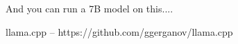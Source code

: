 \documentclass{beamer}
\begin{document}
\begin{frame}[plain]
\end{frame}

\begin{frame}
	And you can run a 7B model on this....
\end{frame}

\begin{frame}[plain]
\end{frame}


\begin{frame}
	llama.cpp -- https://github.com/ggerganov/llama.cpp
\end{frame}
\end{document}
